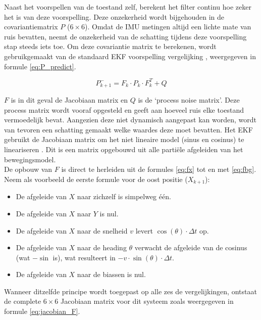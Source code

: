 Naast het voorspellen van de toestand zelf, berekent het filter continu hoe zeker het is van deze voorspelling. Deze onzekerheid wordt bijgehouden in de covariantiematrix $P$ ($6 \times 6$). Omdat de IMU metingen altijd een lichte mate van ruis bevatten, neemt de onzekerheid van de schatting tijdens deze voorspelling stap steeds iets toe. Om deze covariantie matrix te berekenen, wordt gebruikgemaakt van de standaard EKF voorspelling vergelijking \cite{kalmanfilter_net}, weergegeven in formule \ref{eq:P_predict}.


\begin{equation}
    P_{k+1}^- = F_k \cdot P_k \cdot F_k^T + Q
    \label{eq:P_predict}
\end{equation}

$F$ is in dit geval de Jacobiaan matrix en $Q$ is de `process noise matrix'. Deze process matrix wordt vooraf opgesteld en geeft aan hoeveel ruis elke toestand vermoedelijk bevat. Aangezien deze niet dynamisch aangepast kan worden, wordt van tevoren een schatting gemaakt welke waardes deze moet bevatten. Het EKF gebruikt de Jacobiaan matrix om het niet lineaire model (sinus en cosinus) te lineariseren \cite{bar_shalom_estimation}. Dit is een matrix opgebouwd uit alle partiële afgeleiden van het bewegingsmodel. \\

De opbouw van $F$ is direct te herleiden uit de formules \ref{eq:fx} tot en met \ref{eq:fbg}. Neem als voorbeeld de eerste formule voor de oost positie ($X_{k+1}$):
\begin{itemize}
    \item De afgeleide van $X$ naar zichzelf is simpelweg één. 
    \item De afgeleide van $X$ naar $Y$ is nul.
    \item De afgeleide van $X$ naar de snelheid $v$ levert $\cos(\theta) \cdot \Delta t$ op.
    \item De afgeleide van $X$ naar de heading $\theta$ verwacht de afgeleide van de cosinus (wat $-\sin$ is), wat resulteert in $-v \cdot \sin(\theta) \cdot \Delta t$.
    \item De afgeleide van $X$ naar de biassen is nul.
\end{itemize}

Wanneer ditzelfde principe wordt toegepast op alle zes de vergelijkingen, ontstaat de complete $6 \times 6$ Jacobiaan matrix voor dit systeem zoals weergegeven in formule \ref{eq:jacobian_F}.


